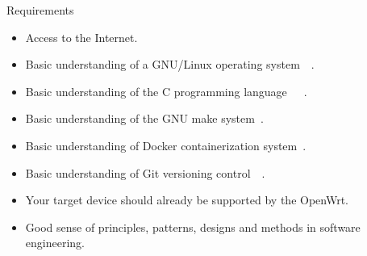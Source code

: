 \begin{withoutheadline}
    \begin{frame}{Requirements}
        \pause
        \begin{itemize}[<+-|alert@+>]
            \item Access to the Internet.
            \item Basic understanding of a GNU/Linux operating system~\cite{starch-how_linux_works}~\cite{starch-linux_command_line}.
            \item Basic understanding of the C programming language~\cite{prentice-c_programming_language}~\cite{wesley-c_primer_plus}~\cite{oreilly-understanding_and_using_c_pointers}.
            \item Basic understanding of the GNU make system~\cite{oreilly-managing_projects_with_gnu_make}.
            \item Basic understanding of Docker containerization system~\cite{turnbull-the_docker_book}.
            \item Basic understanding of Git versioning control~\cite{torvalds-git}~\cite{chacon-pro_git}.
            \item Your target device should already be supported by the OpenWrt.
            \item Good sense of principles, patterns, designs and methods in software engineering.
        \end{itemize}
    \end{frame}
\end{withoutheadline}